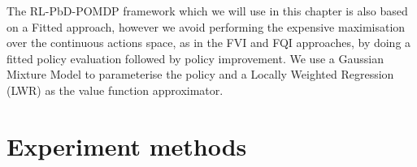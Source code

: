The RL-PbD-POMDP framework which we will use in this chapter is also based on a Fitted approach, however we 
avoid performing the expensive maximisation over the continuous actions space, as in the FVI and FQI approaches, 
by doing a fitted policy evaluation followed by policy improvement. We use a Gaussian Mixture Model to parameterise 
the policy and a Locally Weighted Regression (LWR) as the value function approximator.


\section{Experiment methods}\label{ch4:experiment}



%
%
%

%
%


